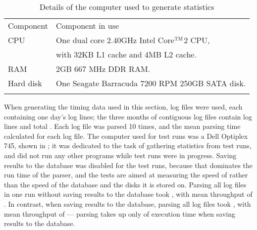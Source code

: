 

\begin{table}[thbp]
    \caption{Details of the computer used to generate statistics}
    \empty{}\label{Details of the computer used to generate statistics}
    \centering{}
    \begin{tabular}[]{ll}
        \tabletopline{}%
        Component  & Component in use                                   \\
        \tablemiddleline{}%
        CPU         & One dual core 2.40GHz Intel\textregistered{}
                        Core$^{\textsc{TM}}$2 CPU,                      \\
                    & with 32KB L1 cache and 4MB L2 cache.              \\
        RAM         & 2GB 667 MHz DDR RAM\@.                            \\
        Hard disk   & One Seagate Barracuda 7200 RPM 250GB SATA disk.   \\
        \tablebottomline{}%
    \end{tabular}
\end{table}

When generating the timing data used in this section, \numberOFlogFILES{}
log files were used, each containing one day's log lines; the three months
of contiguous log files contain \numberOFlogLINEShuman{} log lines and
total .  Each log file was
parsed 10 times, and the mean parsing time calculated for each log file.
The computer used for test runs was a Dell Optiplex 745, shown in
; it was
dedicated to the task of gathering statistics from test runs, and did not
run any other programs while test runs were in progress.  Saving results to
the database was disabled for the test runs, because that dominates the run
time of the parser, and the tests are aimed at measuring the speed of
\parsername{} rather than the speed of the database and the disks it is
stored on.  Parsing all \numberOFlogFILES{} log files in one run without
saving results to the database took
, with mean throughput of
.  In contrast, when saving
results to the database, parsing all \numberOFlogFILES{} log files took
, with mean throughput of
 --- parsing takes up only
 of
execution time when saving results to the database.

